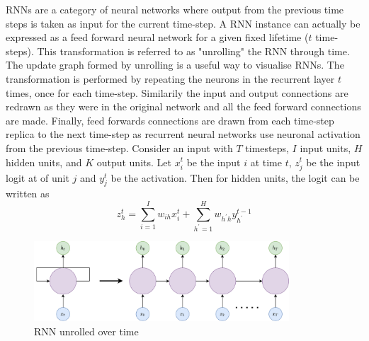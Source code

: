 RNNs are a category of neural networks where output from the previous time steps is taken as input for the current time-step. A RNN instance can actually be expressed as a feed forward neural network for a given fixed lifetime ($t$ time-steps). This transformation is referred to as "unrolling" the RNN through time. The update graph formed by unrolling is a useful way to visualise RNNs. The transformation is performed by repeating the neurons in the recurrent layer $t$ times, once for each time-step. Similarily the input and output connections are redrawn as they were in the original network and all the feed forward connections are made. Finally, feed forwards connections are drawn from each time-step replica to the next time-step as recurrent neural networks use neuronal activation from the previous time-step. Consider an input with $T$ timesteps, $I$ input units, $H$ hidden units, and $K$ output units. Let $x_i^t$ be the input $i$ at time $t$, $z_j^t$ be the input logit at of unit $j$ and $y_j^t$ be the activation. Then for hidden units, the logit can be written as
\begin{equation}
z_h^t = \sum_{i=1}^{I} w_{ih}x_i^t + \sum_{h^\prime =1}^H w_{h^\prime h}y_{h^\prime}^{t-1}
\end{equation}
\begin{figure}[!h]
	\centering
	\includegraphics[width=0.85\textwidth]{Pictures/unrolled-rnn.png}
	\hspace{1mm}
	\caption{RNN unrolled over time} 
	\label{fig:err-surf}
\end{figure}

